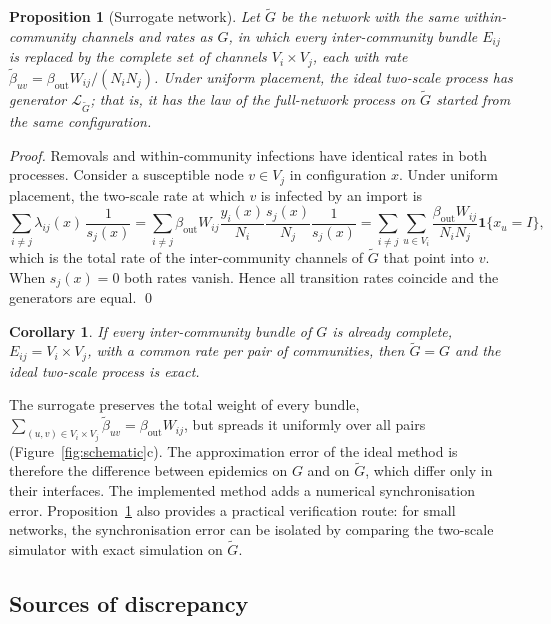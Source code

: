 \documentclass[a4paper,fleqn]{cas-sc}
\newtheorem{proposition}{Proposition}
\newtheorem{corollary}{Corollary}
\newcommand{\ind}{\mathbf{1}}
\begin{document}
\begin{proposition}[Surrogate network]
\label{prop:surrogate}
Let $\tilde G$ be the network with the same within-community channels and rates as $G$, in which every inter-community bundle $E_{ij}$ is replaced by the complete set of channels $V_i\times V_j$, each with rate $\tilde\beta_{uv}=\beta_{\mathrm{out}}W_{ij}/(N_iN_j)$. Under uniform placement, the ideal two-scale process has generator $\mathcal{L}_{\tilde G}$; that is, it has the law of the full-network process on $\tilde G$ started from the same configuration.
\end{proposition}

\begin{proof}
Removals and within-community infections have identical rates in both processes. Consider a susceptible node $v\in V_j$ in configuration $x$. Under uniform placement, the two-scale rate at which $v$ is infected by an import is
\[
\sum_{i\neq j}\lambda_{ij}(x)\,\frac{1}{s_j(x)}
=\sum_{i\neq j}\beta_{\mathrm{out}}W_{ij}\frac{y_i(x)}{N_i}\frac{s_j(x)}{N_j}\frac{1}{s_j(x)}
=\sum_{i\neq j}\sum_{u\in V_i}\frac{\beta_{\mathrm{out}}W_{ij}}{N_iN_j}\ind\{x_u=I\},
\]
which is the total rate of the inter-community channels of $\tilde G$ that point into $v$. When $s_j(x)=0$ both rates vanish. Hence all transition rates coincide and the generators are equal. \qed
\end{proof}

\begin{corollary}
\label{cor:exact}
If every inter-community bundle of $G$ is already complete, $E_{ij}=V_i\times V_j$, with a common rate per pair of communities, then $\tilde G=G$ and the ideal two-scale process is exact.
\end{corollary}

The surrogate preserves the total weight of every bundle, $\sum_{(u,v)\in V_i\times V_j}\tilde\beta_{uv}=\beta_{\mathrm{out}}W_{ij}$, but spreads it uniformly over all pairs (Figure~\ref{fig:schematic}c). The approximation error of the ideal method is therefore the difference between epidemics on $G$ and on $\tilde G$, which differ only in their interfaces. The implemented method adds a numerical synchronisation error. Proposition~\ref{prop:surrogate} also provides a practical verification route: for small networks, the synchronisation error can be isolated by comparing the two-scale simulator with exact simulation on $\tilde G$.

\subsection{Sources of discrepancy}
\label{sec:sources}
\end{document}
